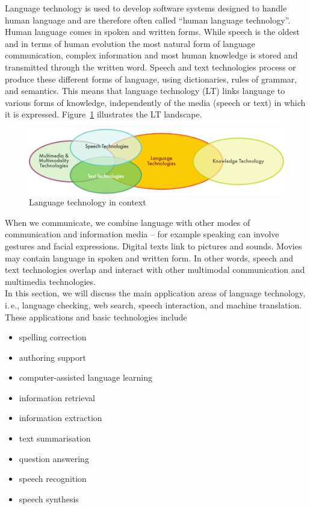 \documentclass{../../metanetpaper}
\begin{document}
\begin{multicols}{2}

Language technology is used to develop software systems designed to handle human language and are therefore often called “human language technology”. Human language comes in spoken and written forms. While speech is the oldest and in terms of human evolution the most natural form of language communication, complex information and most human knowledge is stored and transmitted through the written word. Speech and text technologies process or produce these different forms of language, using dictionaries, rules of grammar, and semantics. This means that language technology (LT) links language to various forms of knowledge, independently of the media (speech or text) in which it is expressed. Figure~\ref{fig:ltincontext_en} illustrates the LT landscape.

\begin{figure}[htb]
  \center
  \includegraphics[width=\textwidth]{../_media/english/language_technologies}
  \caption{Language technology in context}
  \label{fig:ltincontext_en}
\end{figure}

When we communicate, we combine language with other modes of communication and information media -- for example speaking can involve gestures and facial expressions. Digital texts link to pictures and sounds. Movies may contain language in spoken and written form. In other words, speech and text technologies overlap and interact with other multimodal communication and multimedia technologies.\\ 
In this section, we will discuss the main application areas of language technology, i.\,e., language checking, web search, speech interaction, and machine translation. These applications and basic technologies include 

\begin{itemize}
\item spelling correction
\item authoring support
\item computer-assisted language learning
\item information retrieval 
\item information extraction
\item text summarisation
\item question answering
\item speech recognition 
\item speech synthesis 
\end{itemize}


\end{multicols}
\end{document}
